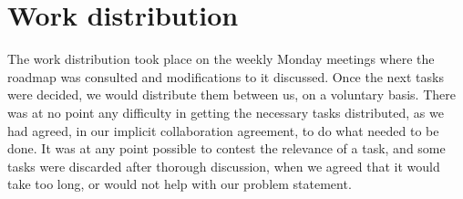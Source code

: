 \section{Work distribution}
The work distribution took place on the weekly Monday meetings where the roadmap was
consulted and modifications to it discussed. Once the next tasks were decided, we
would distribute them between us, on a voluntary basis. There was at no point any
difficulty in getting the necessary tasks distributed, as we had agreed, in our
implicit collaboration agreement, to do what needed to be done. It was at any point
possible to contest the relevance of a task, and some tasks were discarded after
thorough discussion, when we agreed that it would take too long, or would not help
with our problem statement.
